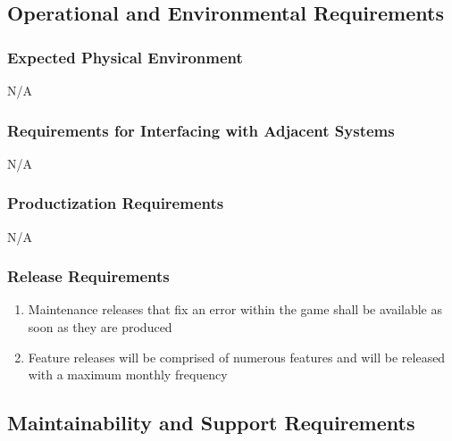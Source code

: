 \documentclass[12pt, titlepage]{article}
\begin{document}

\subsection{Operational and Environmental Requirements}
\label{sub:operational_and_environmental_requirements}

\subsubsection{Expected Physical Environment}
\label{ssub:expected_physical_environment}
N/A

\subsubsection{Requirements for Interfacing with Adjacent Systems}
\label{ssub:requirements_for_interfacing_with_adjacent_systems}
N/A

\subsubsection{Productization Requirements}
\label{ssub:productization_requirements}
N/A

\subsubsection{Release Requirements}
\label{ssub:release_requirements}
\begin{enumerate}[{OE}1. ]
        \item Maintenance releases that fix an error within the game shall be available as soon as they are produced
        \item Feature releases will be comprised of numerous features and will be released with a maximum monthly frequency
\end{enumerate}


\subsection{Maintainability and Support Requirements}
\label{sub:maintainability_and_support_requirements}
\end{document}
